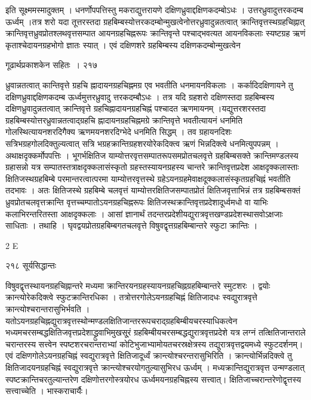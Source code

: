 \documentclass[11pt, openany]{book}
\begin{document}
इति सूक्ष्ममस्मादुक्तम् । धनर्णोपपत्तिस्तु मकराद्युत्तरायणे दक्षिणध्रुवाद्दक्षिणकदम्बोऽधः । उत्तरध्रुवादुत्तरकदम्ब ऊर्ध्वम् ।तत्र शरो यदा तूत्तरस्तदा ग्रहबिम्बस्योत्तरकदम्बोन्मुखत्वेनोत्तरध्रुवादुन्नतत्वात् क्रान्तिवृत्तस्थग्रहचिह्नात् क्रान्तिवृत्तध्रुवप्रोतश्लथवृत्तसम्पात आयनग्रहचिह्नरूपः क्रान्तिवृन्ते पश्चाद्भवत्यत आयनविकलाः स्यष्टग्रह ऋणं कृताश्चेदायनग्रहभोगो ज्ञातः स्यात् । एवं दक्षिणशरे ग्रहबिम्बस्य दक्षिणकदम्बोन्मुखत्वेन


\newpage

\hspace{3cm} गूढार्थप्रकाशकेन सहितः~। \hfill २१७
\vspace{1cm}


\noindent ध्रुवान्नतत्वात् कान्तिवृत्ते ग्रहचि ह्नादायनग्रहचिह्नमग्र एव भवतीति धनमायनविकलाः । कर्कादिदक्षिणायने तु दक्षिणध्रुवाद्दक्षिणकदम्ब ऊर्ध्वमुत्तरध्रुवादु त्तरकदम्बौऽधः । तत्र यदि ग्रहशरो दक्षिणस्तदा ग्रहबिम्बस्य दक्षिणध्रुवादुन्नतत्वात् क्रान्तिवृत्ते ग्रहचिह्नादायनग्रहचिह्नं पश्चादत ऋणमायनम् ।यद्युत्तरशरस्तदा ग्रहबिम्बस्योत्तरध्रुवान्नतत्वाद्ग्रहचि ह्नादायनग्रहचिह्नमग्रे क्रान्तिवृत्ते भवतीत्यायनं धनमिति गोलस्थित्यायनशरदिगैक्य ऋणमयनशरदिग्भेदे धनमिति सिद्धम् । तव ग्रहायनदिशः सत्रिभग्रहगोलदिक्तुल्यत्वात् सत्रि भग्रहक्रान्तिग्रहशरयोरेकदिक्त्व ऋणं भिन्नदिक्त्वे धनमित्युपपन्नम् । अथाक्षदृक्कर्मोपपत्तिः । भूगर्भक्षितिज याम्योत्तरवृत्तसम्पातरूपसमप्रोतचलवृत्ते ग्रहबिम्बसक्ते क्रान्तिमण्डलस्य ग्रहासन्नो यत्र सम्पातस्तत्राक्षदृक्कलासंस्कृतो ग्रहस्तस्यायनग्रहस्य चान्तरे क्रान्तिवृत्तप्रदेश आक्षदृक्कलास्ताः क्षितिजस्थग्रहबिम्बे परमान्तरत्वात्परमा याम्योत्तरवृत्तस्थे ग्रहेऽयनग्रहमेवाक्षदूक्कलासंस्कृतग्रहचिह्नं भवतीति तदभावः । अतः क्षितिजस्थे ग्रहबिम्बे चलवृत्तं याम्योत्तरक्षितिजसम्पातप्रोतं क्षितिजवृत्ताभिन्नं तत्र ग्रहबिम्बसक्तं ध्रुवप्रोतचलवृत्तक्रान्ति वृत्तच्चम्पातोऽयनग्रहचिह्नरूपः क्षितिजस्थक्रान्तिवृत्तप्रदेशादूर्ध्वमधो वा याभिः कलाभिरन्तरितस्ता आक्षदृक्कलाः । आसां ज्ञानार्थं तदन्तरप्रदेशीयद्युरात्रवृत्तखण्डप्रदेशस्थासवोऽक्षजाः साधिताः । तथाहि । घृवद्वयप्रोतग्रहबिम्बगतचलवृत्ते विषुवद्वृत्तग्रहबिम्बान्तरे स्फुटा क्रान्तिः ।


{\tiny{2 E}}

\newpage

\noindent २१८ \hspace{4cm} सूर्यसिद्धान्तः
\vspace{1cm}


\noindent विषुवद्वृत्तस्थायनग्रहचिह्नान्तरे मध्यमा क्रान्तिरयनग्रहस्यायनग्रहचिह्नग्रहबिम्बान्तरे स्मुटशरः । द्वयोः क्रान्त्योरेकदिक्त्वे स्फुटक्रान्तिरधिका । तत्रोत्तरगोलेऽयनग्रहचिह्नं क्षितिजादधः स्वद्युरात्रवृत्ते क्रान्त्योश्चरान्तरासुभिर्भवति । यतोऽयनग्रहचिह्नद्युरात्रवृत्तस्थोन्मण्डलक्षितिजान्तररूपचराद्ग्रहबिम्बीयचरस्याधिकत्वेन भध्यमचरसम्बद्धक्षितिजवृत्तप्रदेशाद्ध्रुवाभिमुखसू्रं ग्रहबिम्बीयचरसम्बद्धद्युरात्रवृत्तप्रदेशे यत्र लग्नं तत्क्षितिजान्तराले चरान्तरस्य सत्त्वेन स्पष्टशरचरान्तराभ्यां कोटिभुजाभ्यामोयतचरस्रक्षेत्रस्य तद्युरात्रवृत्तद्वयमध्ये स्फुटदर्शनम्। एवं दक्षिणगोलेऽयनग्रहचिह्नं स्वद्युरात्रवृत्ते क्षितिजादूर्ध्वं क्रान्त्योश्चरन्तरासुभिरिति । क्रान्त्योर्भिन्नदिक्त्वे तु क्षितिजादयनग्रहचिह्नं स्वद्युरात्रवृत्ते क्रान्त्योश्चरयोगतुल्यासुभिरध ऊर्ध्वम् । मध्यक्रान्तिद्युरात्रवृत्त उन्मण्डलात् स्पष्टक्रान्तिचरतुल्यान्तरेण दक्षिणोत्तरगोस्त्रयोरध ऊर्ध्वमयनग्रहचिह्नस्य सत्त्वात्। क्षितिजाच्चरान्तरेणोद्वृत्तस्य सत्त्वाच्चेति । भास्कराचार्यैः।
\end{document}
